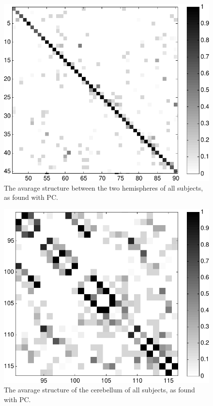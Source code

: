 \documentclass[a4paper, 10pt, english, onecolumn]{article}
\begin{document}
\begin{figure}[h!]
  \centering
  \includegraphics{images/struct_inter_hemisphere}
  \caption{The avarage structure between the two hemispheres of all subjects, as found with PC.}
  \label{fig:struct_inter_hemisphere}
\end{figure}
\begin{figure}[h!]
  \centering
  \includegraphics{images/struct_cerebellum}
  \caption{The avarage structure of the cerebellum of all subjects, as found with PC.}
  \label{fig:struct_cerebellum}
\end{figure}
\end{document}
